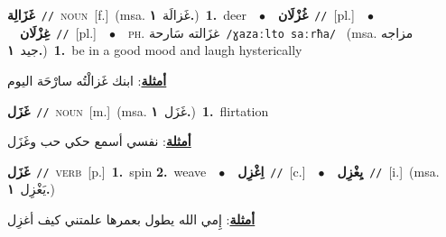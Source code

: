 \documentclass[10pt,a4paper,twoside]{article} %
\begin{document}
\begin{multicols}{2}
{\setlength\topsep{0pt}\textbf{\foreignlanguage{arabic}{غَزَالِة}}\ {\color{gray}\texttt{//}\color{black}}\ \textsc{noun}\ [f.]\ \color{gray}(msa. \foreignlanguage{arabic}{غَزالَة}~\foreignlanguage{arabic}{\textbf{١.}})\color{black}\ \textbf{1.}~deer\ \ $\bullet$\ \ \setlength\topsep{0pt}\textbf{\foreignlanguage{arabic}{غُزْلَان}}\ {\color{gray}\texttt{//}\color{black}}\ [pl.]\ \ $\bullet$\ \ \setlength\topsep{0pt}\textbf{\foreignlanguage{arabic}{غِزْلَان}}\ {\color{gray}\texttt{//}\color{black}}\ [pl.]\ \ $\bullet$\ \ \textsc{ph.} \color{gray} \foreignlanguage{arabic}{غزَالته سَارحة}\color{black}\ {\color{gray}\texttt{/{\sffamily ɣazaːlto saːrħa}/}\color{black}}\ \color{gray} (msa. \foreignlanguage{arabic}{مزاجه جيد}~\foreignlanguage{arabic}{\textbf{١.}})\color{black}\ \textbf{1.}~be in a good mood and laugh hysterically\  \begin{flushright}\color{gray}\foreignlanguage{arabic}{\textbf{\underline{\foreignlanguage{arabic}{أمثلة}}}: ابنك غَزالْتُه سارْحَة اليوم}\end{flushright}\color{black}} \vspace{2mm}

{\setlength\topsep{0pt}\textbf{\foreignlanguage{arabic}{غَزَل}}\ {\color{gray}\texttt{//}\color{black}}\ \textsc{noun}\ [m.]\ \color{gray}(msa. \foreignlanguage{arabic}{غَزَل}~\foreignlanguage{arabic}{\textbf{١.}})\color{black}\ \textbf{1.}~flirtation\  \begin{flushright}\color{gray}\foreignlanguage{arabic}{\textbf{\underline{\foreignlanguage{arabic}{أمثلة}}}: نفسي أسمع حكي حب وغَزَل}\end{flushright}\color{black}} \vspace{2mm}

{\setlength\topsep{0pt}\textbf{\foreignlanguage{arabic}{غَزَل}}\ {\color{gray}\texttt{//}\color{black}}\ \textsc{verb}\ [p.]\ \textbf{1.}~spin  \textbf{2.}~weave\ \ $\bullet$\ \ \setlength\topsep{0pt}\textbf{\foreignlanguage{arabic}{اِغْزِل}}\ {\color{gray}\texttt{//}\color{black}}\ [c.]\ \ $\bullet$\ \ \setlength\topsep{0pt}\textbf{\foreignlanguage{arabic}{يِغْزِل}}\ {\color{gray}\texttt{//}\color{black}}\ [i.]\ \color{gray}(msa. \foreignlanguage{arabic}{يَغْزِل}~\foreignlanguage{arabic}{\textbf{١.}})\color{black}\  \begin{flushright}\color{gray}\foreignlanguage{arabic}{\textbf{\underline{\foreignlanguage{arabic}{أمثلة}}}: إِمي الله يطول بعمرها علمتني كيف أغزِل}\end{flushright}\color{black}} \vspace{2mm}


\end{multicols}
\end{document}
